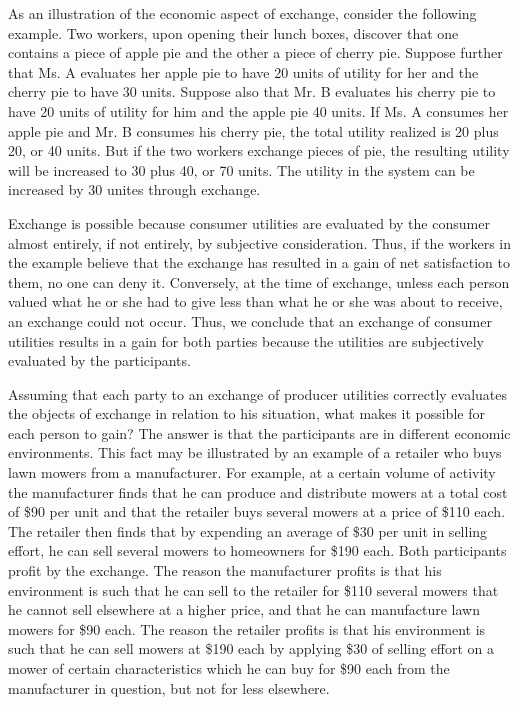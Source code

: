 As an illustration of the economic aspect of exchange, consider the following example. Two workers, upon opening their lunch boxes, discover that one contains a piece of apple pie and the other a piece of cherry pie. Suppose further that Ms. A evaluates her apple pie to have 20 units of utility for her and the cherry pie to have 30 units. Suppose also that Mr. B evaluates his cherry pie to have 20 units of utility for him and the apple pie 40 units. If Ms. A consumes her apple pie and Mr. B consumes his cherry pie, the total utility realized is 20 plus 20, or 40 units. But if the two workers exchange pieces of pie, the resulting utility will be increased to 30 plus 40, or 70 units. The utility in the system can be increased by 30 unites through exchange.

Exchange is possible because consumer utilities are evaluated by the consumer almost entirely, if not entirely, by subjective consideration. Thus, if the workers in the example believe that the exchange has resulted in a gain of net satisfaction to them, no one can deny it. Conversely, at the time of exchange, unless each person valued what he or she had to give less than what he or she was about to receive, an exchange could not occur. Thus, we conclude that an exchange of consumer utilities results in a gain for both parties because the utilities are subjectively evaluated by the participants.

Assuming that each party to an exchange of producer utilities correctly evaluates the objects of exchange in relation to his situation, what makes it possible for each person to gain?  The answer is that the participants are in different economic environments. This fact may be illustrated by an example of a retailer who buys lawn mowers from a manufacturer. For example, at a certain volume of activity the manufacturer finds that he can produce and distribute mowers at a total cost of \$90 per unit and that the retailer buys several mowers at a price of \$110 each. The retailer then finds that by expending an average of \$30 per unit in selling effort, he can sell several mowers to homeowners for \$190 each. Both participants profit by the exchange. The reason the manufacturer profits is that his environment is such that he can sell to the retailer for \$110 several mowers that he cannot sell elsewhere at a higher price, and that he can manufacture lawn mowers for \$90 each. The reason the retailer profits is that his environment is such that he can sell mowers at \$190 each by applying \$30 of selling effort on a mower of certain characteristics which he can buy for \$90 each from the manufacturer in question, but not for less elsewhere.


